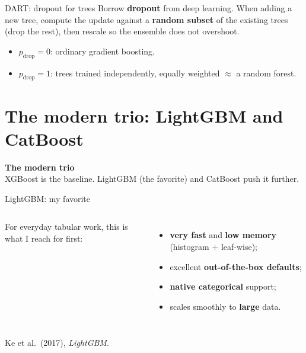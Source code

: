 \documentclass[aspectratio=169]{beamer}
\newcommand{\sectiontransition}[2]{%
  \begin{frame}[plain]
    \vfill
    \begin{center}
      {\Large\color{popblue}\textbf{#1}}\\[10pt]
      {\normalsize #2}
    \end{center}
    \vfill
  \end{frame}}
\begin{document}
\begin{frame}{DART: dropout for trees}
  Borrow \textbf{dropout} from deep learning. When adding a new tree, compute the update against a
  \textbf{random subset} of the existing trees (drop the rest), then rescale so the ensemble does
  not overshoot.
  \vfill
  \begin{itemize}\small
    \item $p_{\text{drop}} = 0$: ordinary gradient boosting.
    \item $p_{\text{drop}} = 1$: trees trained independently, equally weighted $\approx$ a random forest.
  \end{itemize}
  \vfill
\end{frame}

\section{The modern trio: LightGBM and CatBoost}
\sectiontransition{The modern trio}{XGBoost is the baseline. LightGBM (the favorite) and CatBoost push it further.}

\begin{frame}{LightGBM: my favorite}
  \begin{columns}[T]
    For everyday tabular work, this is what I reach for first:
    \begin{itemize}
      \item \textbf{very fast} and \textbf{low memory} (histogram $+$ leaf-wise);
      \item excellent \textbf{out-of-the-box defaults};
      \item \textbf{native categorical} support;
      \item scales smoothly to \textbf{large} data.
    \end{itemize}
  \end{columns}
  \vfill
  \hfill {\scriptsize Ke et al.\ (2017), \emph{LightGBM}.}
\end{frame}
\end{document}
